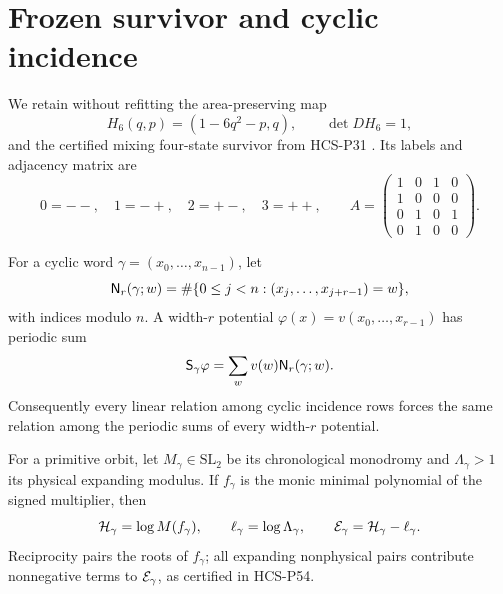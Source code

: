 \section{Frozen survivor and cyclic incidence}

We retain without refitting the area-preserving map
\begin{equation}\label{eq:henon}
 H_6(q,p)=(1-6q^2-p,q),\qquad \det DH_6=1,
\end{equation}
and the certified mixing four-state survivor from HCS-P31
\citep{Henon1976,WangP31}.  Its labels and adjacency matrix are
\[
 0={--},\quad1={-+},\quad2={+-},\quad3={++},
 \qquad
 A=\begin{pmatrix}
 1&0&1&0\\1&0&0&0\\0&1&0&1\\0&1&0&0
 \end{pmatrix}.
\]

For a cyclic word \(\gamma=(x_0,\ldots,x_{n-1})\), let
\begin{equation}\label{eq:block-count}
 \mathsf N_r(\gamma;w)
 =\#\{0\leq j<n:(x_j,\ldots,x_{j+r-1})=w\},
\end{equation}
with indices modulo \(n\).  A width-\(r\) potential
\(\varphi(x)=v(x_0,\ldots,x_{r-1})\) has periodic sum
\begin{equation}\label{eq:block-pairing}
 \mathsf S_\gamma\varphi
 =\sum_w v(w)\mathsf N_r(\gamma;w).
\end{equation}
Consequently every linear relation among cyclic incidence rows forces the
same relation among the periodic sums of every width-\(r\) potential.

For a primitive orbit, let \(M_\gamma\in\mathrm{SL}_2\) be its chronological
monodromy and \(\Lambda_\gamma>1\) its physical expanding modulus.  If
\(f_\gamma\) is the monic minimal polynomial of the signed multiplier, then
\begin{equation}\label{eq:excess}
 \mathcal H_\gamma=\log M(f_\gamma),\qquad
 \ell_\gamma=\log\Lambda_\gamma,\qquad
 \mathcal E_\gamma=\mathcal H_\gamma-\ell_\gamma.
\end{equation}
Reciprocity pairs the roots of \(f_\gamma\); all expanding nonphysical pairs
contribute nonnegative terms to \(\mathcal E_\gamma\), as certified in HCS-P54.
